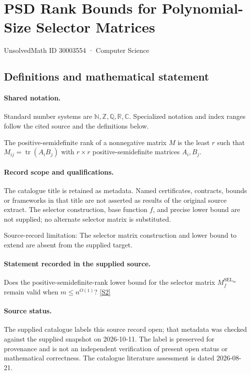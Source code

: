 \documentclass[11pt]{article}
\newcommand{\sref}[2]{\hyperlink{source:#1:#2}{[S#2]}}
\begin{document}
\setcounter{section}{30003553}
\section{PSD Rank Bounds for Polynomial-Size Selector Matrices}\label{30003554}
{\small\sffamily UnsolvedMath ID 30003554 · Computer Science}
\subsection{Definitions and mathematical statement}

\paragraph{Shared notation.}Standard number systems are $\mathbb N,\mathbb Z,\mathbb Q,\mathbb R,\mathbb C$. Specialized notation and index ranges follow the cited source and the definitions below.


The positive-semidefinite rank of a nonnegative matrix $M$ is the least $r$ such that $M_{ij}=\operatorname{tr}(A_iB_j)$ with $r\times r$ positive-semidefinite matrices $A_i,B_j$.
\paragraph{Record scope and qualifications.}
The catalogue title is retained as metadata. Named certificates, contracts, bounds or frameworks in that title are not asserted as results of the original source extract.
The selector construction, base function $f$, and precise lower bound are not supplied; no alternate selector matrix is substituted.

Source-record limitation: The selector matrix construction and lower bound to extend are absent from the supplied target.
\paragraph{Statement recorded in the supplied source.}
Does the positive-semidefinite-rank lower bound for the selector matrix $M_f^{\operatorname{SEL}_m}$ remain valid when $m\leq n^{O(1)}$? \sref{30003554}{2}
\paragraph{Source status.}
The supplied catalogue labels this source record open; that metadata was checked against the supplied snapshot on 2026-10-11. The label is preserved for provenance and is not an independent verification of present open status or mathematical correctness. The catalogue literature assessment is dated 2026-08-21.
\end{document}
